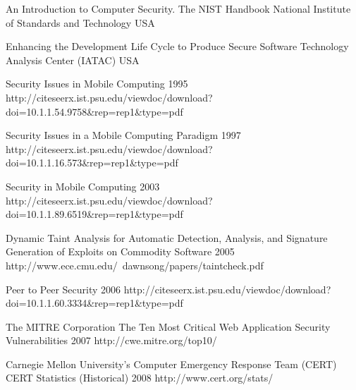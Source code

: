 \begin{thebibliography}{9}
		{}
		{An Introduction to Computer Security. The {NIST} Handbook}
		{National Institute of Standards and Technology}
		{USA}
		{}
	
		{
			\biband
			}
		{Enhancing the Development Life Cycle to Produce Secure Software}
		{Technology Analysis Center (IATAC)}
		{USA}
		{}



		{}
		{Security Issues in Mobile Computing}	
		{1995}	
		{http://citeseerx.ist.psu.edu/viewdoc/download?doi=10.1.1.54.9758\&rep=rep1\&type=pdf}
		
		{
			\biband
			}
		{Security Issues in a Mobile Computing Paradigm}	
		{1997}	
		{http://citeseerx.ist.psu.edu/viewdoc/download?doi=10.1.1.16.573\&rep=rep1\&type=pdf}
	
		{
			\biband
			\biband
			\biband
			}
		{Security in Mobile Computing}	
		{2003}	
		{http://citeseerx.ist.psu.edu/viewdoc/download?doi=10.1.1.89.6519\&rep=rep1\&type=pdf}

		{
			\biband
			}
		{Dynamic Taint Analysis for Automatic Detection, Analysis, and Signature Generation of Exploits on Commodity Software}	
		{2005}	
		{http://www.ece.cmu.edu/~dawnsong/papers/taintcheck.pdf}
	
		{}
		{Peer to Peer Security}	
		{2006}
		{http://citeseerx.ist.psu.edu/viewdoc/download?doi=10.1.1.60.3334\&rep=rep1\&type=pdf}

		{The MITRE Corporation}
		{The Ten Most Critical Web Application Security Vulnerabilities}
		{2007}
		{http://cwe.mitre.org/top10/}

		{Carnegie Mellon University's Computer Emergency Response Team (CERT)}
		{CERT Statistics (Historical)}
		{2008}
		{http://www.cert.org/stats/}
				

\end{thebibliography}
